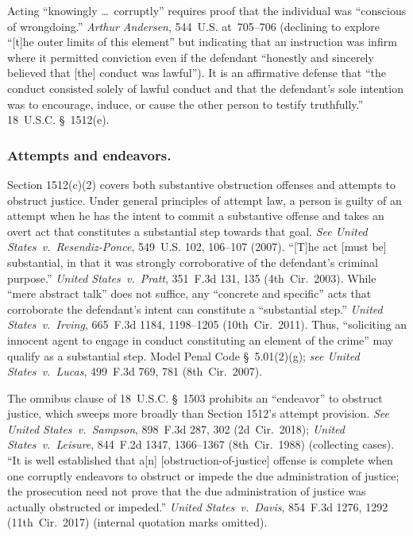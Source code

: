 Acting ``knowingly \dots\ corruptly'' requires proof that the individual was ``conscious of wrongdoing.''
\textit{Arthur Andersen}, 544~U.S. at~705--706 (declining to explore ``[t]he outer limits of this element'' but indicating that an instruction was infirm where it permitted conviction even if the defendant ``honestly and sincerely believed that [the] conduct was lawful'').
It is an affirmative defense that ``the conduct consisted solely of lawful conduct and that the defendant's sole intention was to encourage, induce, or cause the other person to testify truthfully.''
18~U.S.C. \S~1512(e).

\subsubsection*{Attempts and endeavors.}

Section 1512(c)(2) covers both substantive obstruction offenses and attempts to obstruct justice. Under general principles of attempt law, a person is guilty of an attempt when he has the intent to commit a substantive offense and takes an overt act that constitutes a substantial step towards that goal.
\textit{See United States~v.\ Resendiz-Ponce}, 549~U.S. 102, 106--107 (2007).
``[T]he act [must be] substantial, in that it was strongly corroborative of the defendant's criminal purpose.''
\textit{United States~v.\ Pratt}, 351~F.3d 131, 135 (4th~Cir.~2003).
While ``mere abstract talk'' does not suffice, any ``concrete and specific'' acts that corroborate the defendant's intent can constitute a ``substantial step.''
\textit{United States~v.\ Irving}, 665~F.3d 1184, 1198--1205 (10th~Cir.~2011).
Thus, ``soliciting an innocent agent to engage in conduct constituting an element of the crime'' may qualify as a substantial step.
Model Penal Code \S~5.01(2)(g);
\textit{see United States~v.\ Lucas}, 499~F.3d 769, 781 (8th~Cir.~2007).

The omnibus clause of 18~U.S.C. \S~1503 prohibits an ``endeavor'' to obstruct justice, which sweeps more broadly than Section 1512's attempt provision.
\textit{See United States~v.\ Sampson}, 898~F.3d 287, 302 (2d~Cir.~2018);
\textit{United States~v.\ Leisure}, 844~F.2d 1347, 1366--1367 (8th~Cir.~1988) (collecting cases).
``It is well established that a[n] [obstruction-of-justice] offense is complete when one corruptly endeavors to obstruct or impede the due administration of justice;
the prosecution need not prove that the due administration of justice was actually obstructed or impeded.''
\textit{United States~v.\ Davis}, 854~F.3d 1276, 1292 (11th~Cir.~2017) (internal quotation marks omitted).

